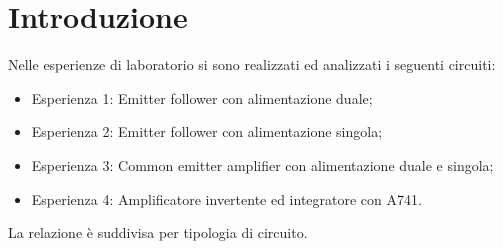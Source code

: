 \documentclass{report}
\begin{document}
\addtocounter{chapter}{-1}
	\begin{frontespizio}
		\Margini{3cm}{3cm}{3cm}{3cm}
		\Punteggiatura{}
		\begin{Preambolo*}
			\usepackage[italian]{babel}
			\usepackage[T1]{fontenc}
			\usepackage[utf8]{inputenc}
			\usepackage{microtype}
			\usepackage{lmodern}
			\graphicspath{{img/}}
			
			\renewcommand{\frontinstitutionfont}{\fontsize{14}{17}\bfseries\scshape}
			\renewcommand{\fronttitlefont}{\fontsize{17}{21}\bfseries\scshape}
			\renewcommand{\frontfootfont}{\fontsize{12}{14}\bfseries\scshape}
		\end{Preambolo*}
	\end{frontespizio}



\newpage
\null
\thispagestyle{empty}
\newpage

\tableofcontents

\newpage
\null
\newpage

\chapter{Introduzione}
Nelle esperienze di laboratorio si sono realizzati ed analizzati i seguenti circuiti:
\begin{itemize}
\item Esperienza 1: Emitter follower con alimentazione duale; 
\item Esperienza 2: Emitter follower con alimentazione singola; 
\item Esperienza 3: Common emitter amplifier con alimentazione duale e singola; 
\item Esperienza 4: Amplificatore invertente ed integratore con 	\textmu A741.
\end{itemize}
La relazione è suddivisa per tipologia di circuito.
\end{document}
